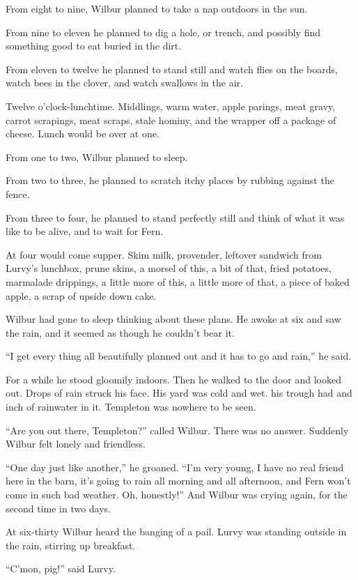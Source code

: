 \documentclass[a4paper, oneside]{book}
\begin{document}
 From eight to nine, Wilbur planned to take a nap outdoors in the
sun. 

From nine to eleven he planned to dig a hole, or trench, and
possibly find something good to eat buried in the dirt.

 From eleven to twelve he planned to stand still and watch flies on
the boards, watch bees in the clover, and watch swallows in the air.

 Twelve o'clock-lunchtime. Middlings, warm water, apple parings,
meat gravy, carrot scrapings, meat scraps, stale hominy, and the
wrapper off a package of cheese. Lunch would be over at one.

 From one to two, Wilbur planned to sleep.
 
 From two to three, he planned to scratch itchy places by rubbing
against the fence.

 From three to four, he planned to stand perfectly still and think of
what it was like to be alive, and to wait for Fern. 

 At four would come supper. Skim milk, provender, leftover
sandwich from Lurvy's lunchbox, prune skins, a morsel of this, a 
bit of that, fried potatoes, marmalade drippings, a little more of
this, a little more of that, a piece of baked apple, a scrap of upside
down cake.

 Wilbur had gone to sleep thinking about these plans. He awoke at
six and saw the rain, and it seemed as though he couldn't bear it.

 ``I get every thing all beautifully planned out and it has to go and
rain,'' he said.

 For a while he stood gloomily indoors. Then he walked to the door
and looked out. Drops of rain struck his face. His yard was cold
and wet. his trough had and inch of rainwater in it. Templeton was
nowhere to be seen. 

``Are you out there, Templeton?'' called Wilbur. There was no
answer. Suddenly Wilbur felt lonely and friendless.

 ``One day just like another,'' he groaned. ``I'm very young, I have
no real friend here in the barn, it's going to rain all morning and all
afternoon, and Fern won't come in such bad weather. Oh,
honestly!'' And Wilbur was crying again, for the second time in two
days.

 At six-thirty Wilbur heard the banging of a pail. Lurvy was
standing outside in the rain, stirring up breakfast.

 ``C'mon, pig!'' said Lurvy.
 
\end{document}
